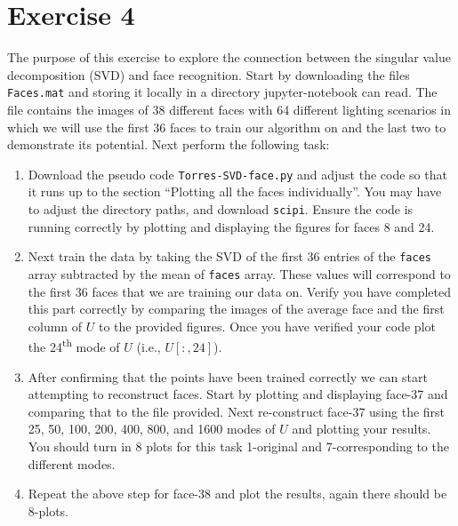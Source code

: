\newcommand{\ts}{\textsuperscript}
\section{Exercise 4}
The purpose of this exercise to explore the connection between the singular
value decomposition (SVD) and face recognition. Start by downloading the
files \texttt{Faces.mat} and storing it locally in a directory
jupyter-notebook can read. The file contains the images of 38
different faces with 64 different lighting scenarios in which we will use
the first 36 faces to train our algorithm on and the last two to
demonstrate its potential. Next perform the following task:
\begin{enumerate}[label=\arabic*.]
    \item Download the pseudo code \texttt{Torres-SVD-face.py} and adjust
        the code so that it runs up to the section ``Plotting all the faces
        individually''. You may have to adjust the directory paths, and
        download \texttt{scipi}. Ensure the code is running correctly by
        plotting and displaying the figures for faces 8 and 24.

    \item Next train the data by taking the SVD of the first 36 entries of
        the \texttt{faces} array subtracted by the mean of \texttt{faces}
        array. These values will correspond to the first 36 faces that we
        are training our data on. Verify you have completed this part
        correctly by comparing the images of the average face and the first
        column of $U$ to the provided figures. Once you have verified your
        code plot the 24\ts{th} mode of $U$ (i.e., $U[:,24]$).

    \item After confirming that the points have been trained correctly we
        can start attempting to reconstruct faces. Start by plotting and
        displaying face-37 and comparing that to the file provided. Next
        re-construct face-37 using the first 25, 50, 100, 200, 400, 800,
        and 1600 modes of $U$ and plotting your results. You should turn in
        8 plots for this task 1-original and 7-corresponding to the
        different modes. 

    \item Repeat the above step for face-38 and plot the results, again
        there should be 8-plots.

\end{enumerate}
